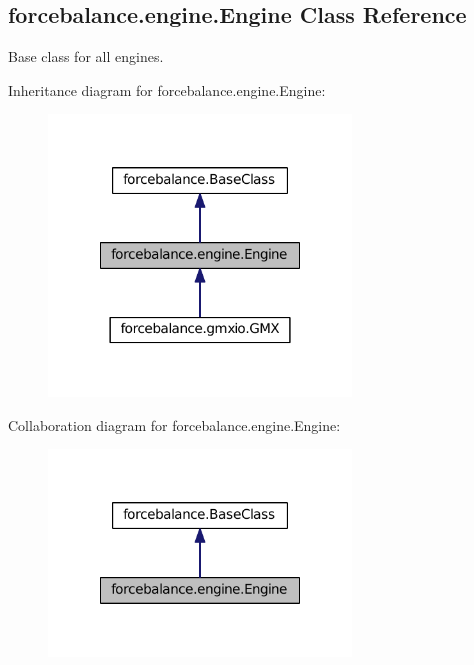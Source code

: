\hypertarget{classforcebalance_1_1engine_1_1Engine}{\subsection{forcebalance.\-engine.\-Engine Class Reference}
\label{classforcebalance_1_1engine_1_1Engine}
}


Base class for all engines.  




Inheritance diagram for forcebalance.\-engine.\-Engine\-:\nopagebreak
\begin{figure}[H]
\begin{center}
\leavevmode
\includegraphics[width=228pt]{classforcebalance_1_1engine_1_1Engine__inherit__graph}
\end{center}
\end{figure}


Collaboration diagram for forcebalance.\-engine.\-Engine\-:\nopagebreak
\begin{figure}[H]
\begin{center}
\leavevmode
\includegraphics[width=228pt]{classforcebalance_1_1engine_1_1Engine__coll__graph}
\end{center}
\end{figure}

